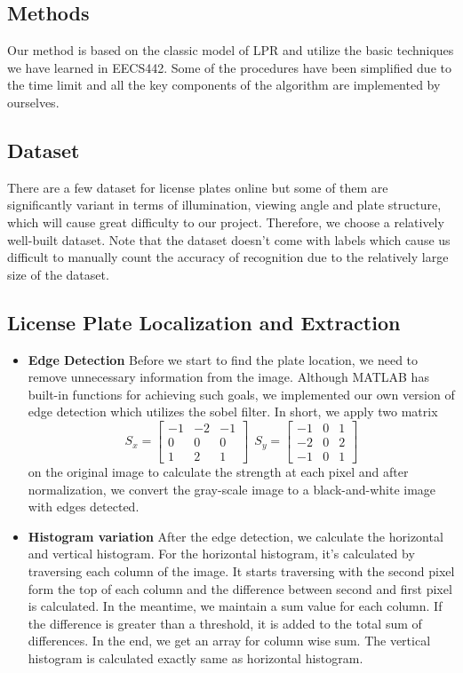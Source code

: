 \documentclass{article}
\begin{document}
\begin{spacing}{1.0}
\section{Methods}
Our method is based on the classic model of LPR and utilize the basic techniques we have learned in EECS442. Some of the procedures have been simplified due to the time limit and all the key components of the algorithm are implemented by ourselves.

\subsection{Dataset}
There are a few dataset for license plates online but some of them are significantly variant in terms of illumination, viewing angle and plate structure, which will cause great difficulty to our project. Therefore, we choose a relatively well-built dataset. Note that the dataset doesn't come with labels which cause us difficult to manually count the accuracy of recognition due to the relatively large size of the dataset.

\subsection{License Plate Localization and Extraction}
\begin{itemize}
	\item \textbf{Edge Detection} Before we start to find the plate location, we need to remove unnecessary information from the image. Although MATLAB has built-in functions for achieving such goals, we implemented our own version of edge detection which utilizes the sobel filter. In short, we apply two matrix
	$$
	S_x =
	\begin{bmatrix}
	-1 & -2 & -1 \\
	0 & 0 & 0 \\
	1 & 2 & 1
	\end{bmatrix}
	~~
	S_y = 
	\begin{bmatrix}
	-1 & 0 & 1 \\
	-2 & 0 & 2 \\
	-1 & 0 & 1
	\end{bmatrix}
	$$
	on the original image to calculate the strength at each pixel and after normalization, we convert the gray-scale image to a black-and-white image with edges detected.
	
	\item \textbf{Histogram variation} After the edge detection, we calculate the horizontal and vertical histogram. For the horizontal histogram, it's calculated by traversing each column of the image. It starts traversing with the second pixel form the top of each column and the difference between second and first pixel is calculated. In the meantime, we maintain a sum value for each column. If the difference is greater than a threshold, it is added to the total sum of differences. In the end, we get an array for column wise sum. The vertical histogram is calculated exactly same as horizontal histogram.
	

\end{itemize}
\end{spacing}
\end{document}

